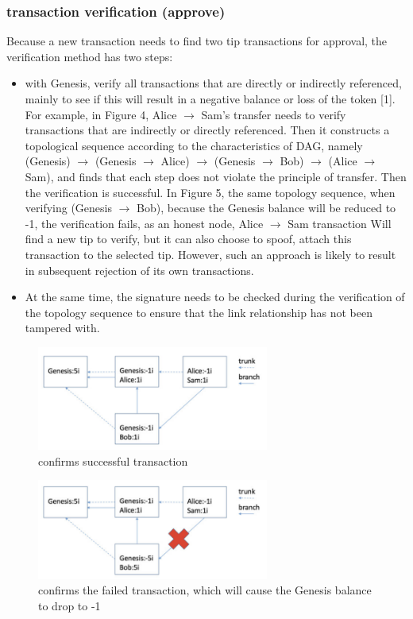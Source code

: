 \subsubsection{transaction verification (approve)}
Because a new transaction needs to find two tip transactions for approval, the verification method has two steps:
\begin{itemize}
\item with Genesis, verify all transactions that are directly or indirectly referenced, mainly to see if this will result in a negative balance or loss of the token [1]. For example, in Figure 4, Alice $\rightarrow$ Sam's transfer needs to verify transactions that are indirectly or directly referenced. Then it constructs a topological sequence according to the characteristics of DAG, namely (Genesis) $\rightarrow$ (Genesis $\rightarrow$ Alice) $\rightarrow$ (Genesis $\rightarrow$ Bob) $\rightarrow$ (Alice $\rightarrow$ Sam), and finds that each step does not violate the principle of transfer. Then the verification is successful. In Figure 5, the same topology sequence, when verifying (Genesis $\rightarrow$ Bob), because the Genesis balance will be reduced to -1, the verification fails, as an honest node, Alice $\rightarrow$ Sam transaction Will find a new tip to verify, but it can also choose to spoof, attach this transaction to the selected tip. However, such an approach is likely to result in subsequent rejection of its own transactions.
\item At the same time, the signature needs to be checked during the verification of the topology sequence to ensure that the link relationship has not been tampered with.
\end{itemize}

\begin{figure}[H]
	\centering
	\includegraphics[width=3.0in]{figures/screenshot004.png}
	\caption{confirms successful transaction}
	\label{simulationfigure}
\end{figure}

\begin{figure}[H]
	\centering
	\includegraphics[width=3.0in]{figures/screenshot005.png}
	\caption{confirms the failed transaction, which will cause the Genesis balance to drop to -1}
	\label{simulationfigure}
\end{figure}

